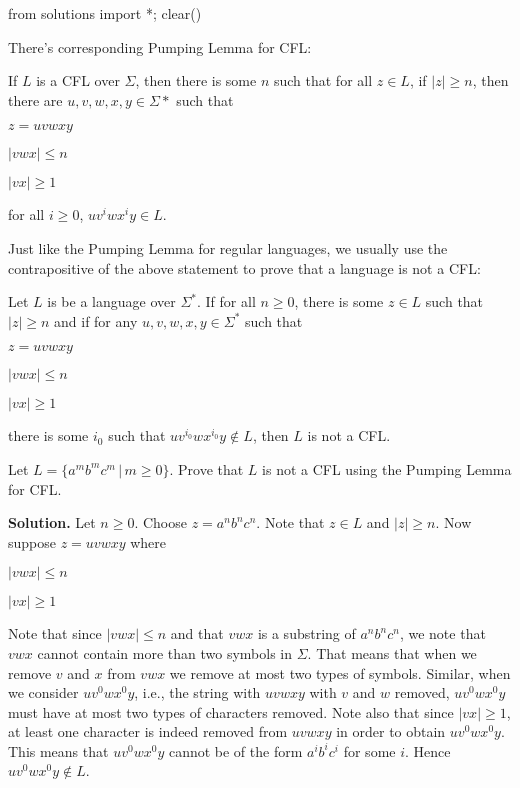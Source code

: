 \begin{python0}
from solutions import *; clear()
\end{python0}

There's corresponding Pumping Lemma for CFL:

\begin{lem}
If $L$ is a CFL over $\Sigma$, then there is some $n$ such that for
all $z \in L$, if $|z|\geq n$, then there are $u,v,w,x,y \in
\Sigma*$ such that
\begin{tightlist}
 \item $z = uvwxy$
 \item $|vwx| \leq n$
 \item $|vx| \geq 1$
 \item for all $i \geq 0$, $uv^iwx^iy \in L$.
\end{tightlist}
\end{lem}

Just like the Pumping Lemma for regular languages, we usually use
the contrapositive of the above statement to prove that a language
is not a CFL:

\begin{lem}
Let $L$ is be a language over $\Sigma^*$. If for all $n \geq 0$,
there is some $z \in L$ such that $|z| \geq n$ and if for any
$u,v,w,x,y \in \Sigma^*$ such that
\begin{tightlist}
 \item $z = uvwxy$
 \item $|vwx| \leq n$
 \item $|vx| \geq 1$
 \item there is some $i_0$ such that $uv^{i_0} w x^{i_0} y \notin
 L$,
then $L$ is not a CFL.
\end{tightlist}
\end{lem}



\newpage
\begin{eg}
Let $L = \{a^mb^mc^m \,|\, m \geq 0\}$. Prove that $L$ is not a CFL
using the Pumping Lemma for CFL.
\end{eg}

\textbf{Solution.} Let $n \geq 0$. Choose $z = a^nb^nc^n$. Note that $z
\in L$ and $|z| \geq n$. Now suppose $z = uvwxy$ where
\begin{tightlist}
\item $|vwx|\leq n$
\item $|vx| \geq 1$
\end{tightlist}

Note that since $|vwx| \leq n$ and that $vwx$ is a substring of
$a^nb^nc^n$, we note that $vwx$ cannot contain more than two symbols
in $\Sigma$. That means that when we remove $v$ and $x$ from $vwx$
we remove at most two types of symbols. Similar, when we consider
$uv^0wx^0y$, i.e., the string with $uvwxy$ with $v$ and $w$ removed,
$uv^0wx^0y$ must have at most two types of characters removed. Note
also that since $|vx| \geq 1$, at least one character is indeed
removed from $uvwxy$ in order to obtain $uv^0wx^0y$. This means that
$uv^0wx^0y$ cannot be of the form $a^i b^i c^i$ for some $i$. Hence
$uv^0wx^0y \notin L$.


